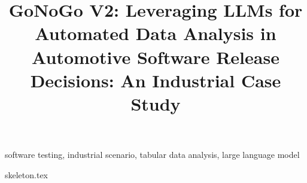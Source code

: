 \documentclass[conference]{IEEEtran}
\begin{document}
\title{GoNoGo V2: Leveraging LLMs for Automated Data Analysis in Automotive Software Release Decisions: An Industrial Case Study\\
}


\maketitle
\thispagestyle{plain}
\pagestyle{plain}

\begin{IEEEkeywords}
software testing, industrial scenario, tabular data analysis, large language model
\end{IEEEkeywords}


{skeleton.tex}



\vspace{12pt}
\end{document}
